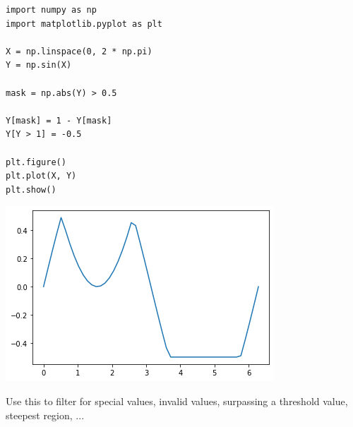 \begin{frame}[fragile]
%
\vspace{-1pt}
\begin{tcbraster}[raster columns=2,
                  raster equal height,
                  nobeforeafter,
                  raster column skip=0.2cm]
\begin{codebox}
\begin{verbatim}
import numpy as np
import matplotlib.pyplot as plt

X = np.linspace(0, 2 * np.pi)
Y = np.sin(X)

mask = np.abs(Y) > 0.5

Y[mask] = 1 - Y[mask]
Y[Y > 1] = -0.5

plt.figure()
plt.plot(X, Y)
plt.show()
\end{verbatim}
\end{codebox}
%
\begin{tcolorbox}[title=Output: Compare Operation]
\hspace{-14pt}
\includegraphics[width=1.15\linewidth]{./gfx/np-comp}
\end{tcolorbox}
\end{tcbraster}
%
\vspace{-9pt}
\begin{hintbox}
\footnotesize
Use this to filter for special values, \eg invalid values, surpassing a threshold value, steepest region, ...
\end{hintbox}
%
\end{frame}


